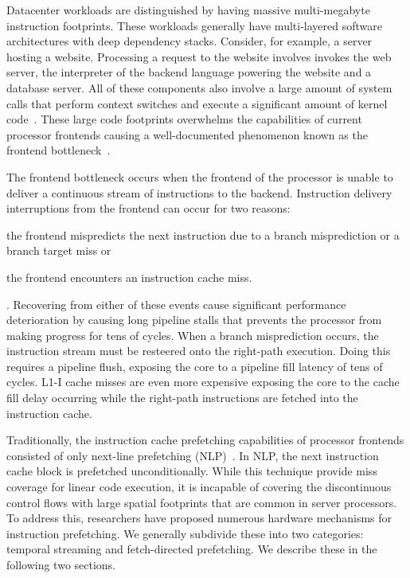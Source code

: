 \documentclass[../main.tex]{subfiles}
\begin{document}
\begin{refsection}[main-bib]
\label{sec:btb-background}


Datacenter workloads are distinguished by having massive
multi-megabyte instruction footprints. These workloads generally have
multi-layered software architectures with deep dependency
stacks. Consider, for example, a server hosting a website. Processing
a request to the website involves invokes the web server, the
interpreter of the backend language powering the website and a
database server. All of these components also involve a large amount
of system calls that perform context switches and execute a
significant amount of kernel
code~\cite{ferdman12_clear_cloud,ailamaki99_dbmss_moder_proces}. These
large code footprints overwhelms the capabilities of current processor
frontends causing a well-documented phenomenon known as the frontend
bottleneck~\cite{kanev15_profil,ferdman12_clear_cloud,ayers19_asmdb,kanev15_profil,kumar17_boomer,kumar18_blast_throug_front_end_bottl_with_shotg,kumar20_shoot_down_server_front_end_bottl,spracklen05_effec_instr_prefet_chip_multip}.


The frontend bottleneck occurs when the frontend of the processor is
unable to deliver a continuous stream of instructions to the backend.
Instruction delivery interruptions from the frontend can occur for two
reasons: \begin{inparaenum}[1)] \item the frontend mispredicts the
  next instruction due to a branch misprediction or a branch target
  miss or \item the frontend encounters an instruction cache
  miss.\end{inparaenum}. Recovering from either of these events cause
significant performance deterioration by causing long pipeline stalls
that prevents the processor from making progress for tens of
cycles. When a branch misprediction occurs, the instruction stream
must be resteered onto the right-path execution. Doing this requires a
pipeline flush, exposing the core to a pipeline fill latency of tens
of cycles. L1-I cache misses are even more expensive exposing the core
to the cache fill delay occurring while the right-path instructions are
fetched into the instruction cache.

Traditionally, the instruction cache prefetching capabilities of
processor frontends consisted of only next-line prefetching
(NLP)~\cite{nextline_pref}. In NLP, the next instruction cache block
is prefetched unconditionally. While this technique provide miss
coverage for linear code execution, it is incapable of covering the
discontinuous control flows with large spatial footprints that are
common in server processors. To address this, researchers have
proposed numerous hardware mechanisms for instruction prefetching. We
generally subdivide these into two categories: temporal streaming and
fetch-directed prefetching. We describe these in the following two
sections.


\end{refsection}
\end{document}

